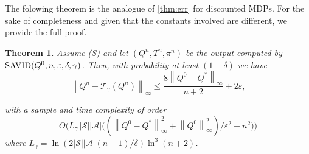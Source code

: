 \documentclass{article}
\newcommand{\cA}{\mathcal{A}}
\newcommand{\cS}{\mathcal{S}}
\newcommand{\T}{\mathcal{T}}
\newcommand*{\infn}[1]{\left\|{#1}\right\|_{\infty}}
\theoremstyle{plain}
\newtheorem{theorem}{Theorem}[section]
\theoremstyle{definition}
\theoremstyle{remark}
\begin{document}
The folowing theorem is the analogue of \cref{thm:err} for discounted MDPs. For the sake of completeness and given that the constants involved are different, we provide the full proof.
\begin{theorem}\label{thm:err-d}
Assume \mbox{\sc (S)} and let $(Q^n,T^n,\pi^n)$ be the output computed by $\mbox{\rm SAVID}(Q^0,n,\varepsilon,\delta, \gamma)$. Then, with probability at least $(1-\delta)$ we have
\vspace{-1ex}
$$  \infn{Q^n-\T_\gamma(Q^n)}\leq \frac{8\infn{Q^0-Q^*}}{n+2}+2\varepsilon,$$

\vspace{-2ex}
with a sample and time complexity of order $${O}\big(L_\gamma\,|\cS||\cA|\big(({\infn{Q^0-Q^*}^{2}+\infn{Q^0}^{2}})/{\varepsilon^{2}}+n^2\big)\big)$$ 
where  
$L_\gamma=\ln(2|\cS||\cA|(n+1)/\delta)\ln^3(n+2)$.
\end{theorem}
\end{document}
